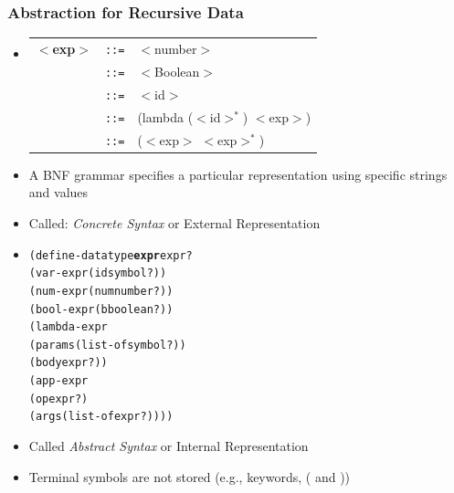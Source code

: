 \documentclass{beamer}
\newcommand{\is}{\texttt{::=}}
\begin{document}
\begin{frame}[fragile]
\frametitle{Abstraction for Recursive Data}
\begin{scriptsize}
\begin{itemize}
\item<1->
\begin{tabular}{lll}
  $<$\textbf{exp}$>$ & \is{} & $<$number$>$ \\
            & \is{} & $<$Boolean$>$ \\
            & \is{} & $<$id$>$ \\
            & \is{} & (lambda ($<$id$>^*$) $<$exp$>$) \\
            & \is{} & ($<$exp$>$ $<$exp$>^*$) \\
\end{tabular}

\item<1-> A BNF grammar specifies a particular representation using specific strings and values

\item<1-> Called: \emph{Concrete Syntax} or External Representation

\item<2->
\begin{alltt}
(define-datatype \textbf{expr} expr?
  (var-expr (id symbol?))
  (num-expr (num number?))
  (bool-expr (b boolean?))
  (lambda-expr
   (params (list-of symbol?))
   (body expr?))
  (app-expr
   (op expr?)
   (args (list-of expr?))))
\end{alltt}

\item<2-> Called \emph{Abstract Syntax} or Internal Representation
	
\item<2-> Terminal symbols are not stored (e.g., keywords, ( and ))

\end{itemize}
\end{scriptsize}
\end{frame}
\end{document}
